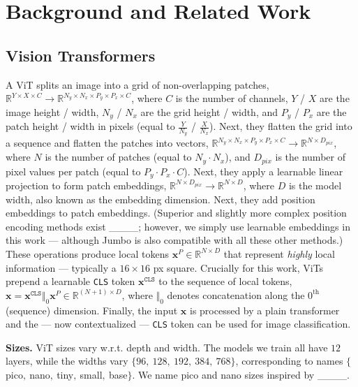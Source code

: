\section{Background and Related Work}
\subsection{Vision Transformers}

A ViT splits an image into a grid of non-overlapping patches, $\mathbb{R}^{Y \times X \times C}\to \mathbb{R}^{N_y \times N_x \times P_y \times P_x \times C}$, where $C$ is the number of channels, $Y$ / $X$ are the image height / width, $N_y$ / $N_x$ are the grid height / width, and $P_y$ / $P_x$ are the patch height / width in pixels (equal to $\frac{Y}{N_y}$ / $\frac{X}{N_x}$). Next, they flatten the grid into a sequence and flatten the patches into vectors, $\mathbb{R}^{N_y \times N_x \times P_y \times P_x \times C}\to \mathbb{R}^{N \times D_{pix}}$, where $N$ is the number of patches (equal to $N_y \cdot N_x$), and $D_{pix}$ is the number of pixel values per patch (equal to $P_y \cdot P_x \cdot C$). Next, they apply a learnable linear projection to form patch embeddings, $\mathbb{R}^{N \times D_{pix}}\to \mathbb{R}^{N \times D}$, where $D$ is the model width, also known as the embedding dimension. Next, they add position embeddings to patch embeddings. (Superior and slightly more complex position encoding methods exist ____; however, we simply use learnable embeddings in this work --- although Jumbo is also compatible with all these other methods.) These operations produce local tokens $\mathbf{x}^{P}\in \mathbb{R}^{N \times D}$ that represent \emph{highly} local information --- typically a $16\times16$ px square. Crucially for this work, ViTs prepend a learnable \texttt{CLS} token $\mathbf{x}^{\texttt{CLS}}$ to the sequence of local tokens, $\mathbf{x} = \mathbf{x}^{\texttt{CLS}} \Vert_{0} \mathbf{x}^{P} \in \mathbb{R}^{(N+1) \times D}$, where $\Vert_{0}$ denotes concatenation along the $0^{\text{th}}$ (sequence) dimension. Finally, the input $\mathbf{x}$ is processed by a plain transformer and the --- now contextualized --- \texttt{CLS} token can be used for image classification.

\textbf{Sizes.} ViT sizes vary w.r.t. depth and width. The models we train all have $12$ layers, while the widths vary $\{96, ~128, ~192, ~384, ~768\}$, corresponding to names $\{$pico$, ~$nano$, ~$tiny$, ~$small$, ~$base$\}$. We name pico and nano sizes inspired by ____.

